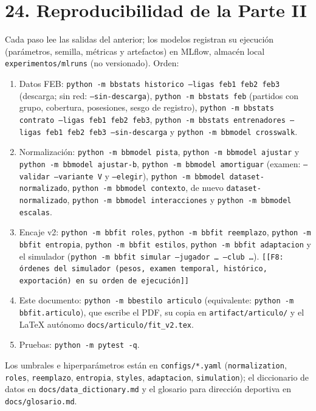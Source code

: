 \documentclass[10pt,a4paper]{article}
\newcommand{\fochopendiente}[1]{\textcolor{red!60!black}{\texttt{[[F8: #1]]}}}
\begin{document}
\section*{24. Reproducibilidad de la Parte II}
Cada paso lee las salidas del anterior; los modelos registran su ejecución (parámetros, semilla, métricas y artefactos) en MLflow, almacén local \texttt{experimentos/\allowbreak{}mlruns} (no versionado). Orden:

\begin{enumerate}
  \item Datos FEB: \texttt{python -m bbstats historico --ligas feb1 feb2 feb3} (descarga; sin red: \texttt{--sin-descarga}), \texttt{python -m bbstats feb} (partidos con grupo, cobertura, posesiones, sesgo de registro), \texttt{python -m bbstats contrato --ligas feb1 feb2 feb3}, \texttt{python -m bbstats entrenadores --ligas feb1 feb2 feb3 --sin-descarga} y \texttt{python -m bbmodel crosswalk}.
  \item Normalización: \texttt{python -m bbmodel pista}, \texttt{python -m bbmodel ajustar} y \texttt{python -m bbmodel ajustar-b}, \texttt{python -m bbmodel amortiguar} (examen: \texttt{--validar --variante V} y \texttt{--elegir}), \texttt{python -m bbmodel dataset-normalizado}, \texttt{python -m bbmodel contexto}, de nuevo \texttt{dataset-normalizado}, \texttt{python -m bbmodel interacciones} y \texttt{python -m bbmodel escalas}.
  \item Encaje v2: \texttt{python -m bbfit roles}, \texttt{python -m bbfit reemplazo}, \texttt{python -m bbfit entropia}, \texttt{python -m bbfit estilos}, \texttt{python -m bbfit adaptacion} y el simulador (\texttt{python -m bbfit simular --jugador \ldots{} --club \ldots{}}). \fochopendiente{órdenes del simulador (pesos, examen temporal, histórico, exportación) en su orden de ejecución}
  \item Este documento: \texttt{python -m bbestilo articulo} (equivalente: \texttt{python -m bbfit.articulo}), que escribe el PDF, su copia en \texttt{artifact/\allowbreak{}articulo/\allowbreak{}} y el LaTeX autónomo \texttt{docs/\allowbreak{}articulo/\allowbreak{}fit\_v2.tex}.
  \item Pruebas: \texttt{python -m pytest -q}.
\end{enumerate}
Los umbrales e hiperparámetros están en \texttt{configs/\allowbreak{}*.yaml} (\texttt{normalization}, \texttt{roles}, \texttt{reemplazo}, \texttt{entropia}, \texttt{styles}, \texttt{adaptacion}, \texttt{simulation}); el diccionario de datos en \texttt{docs/\allowbreak{}data\_dictionary.md} y el glosario para dirección deportiva en \texttt{docs/\allowbreak{}glosario.md}.
\end{document}
